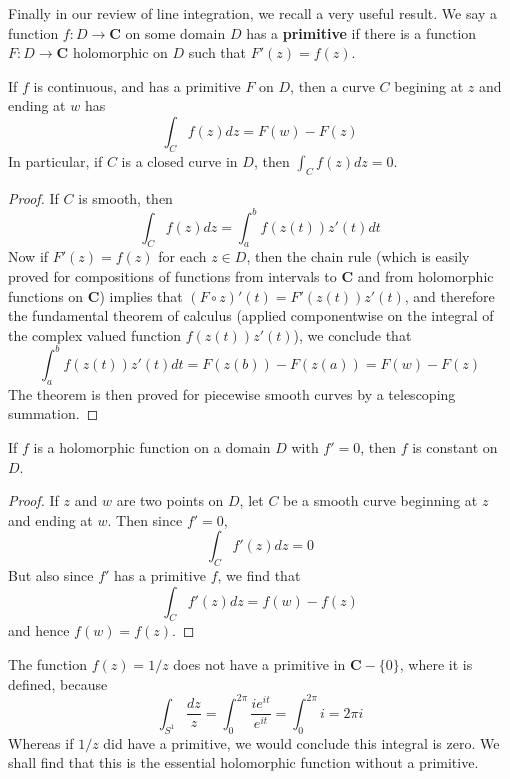 Finally in our review of line integration, we recall a very useful result. We say a function $f: D \to \mathbf{C}$ on some domain $D$ has a {\bf primitive} if there is a function $F: D \to \mathbf{C}$ holomorphic on $D$ such that $F'(z) = f(z)$.

\begin{theorem}
    If $f$ is continuous, and has a primitive $F$ on $D$, then a curve $C$ begining at $z$ and ending at $w$ has
    \[ \int_C f(z)dz = F(w) - F(z) \]
    In particular, if $C$ is a closed curve in $D$, then $\int_C f(z)dz = 0$.
\end{theorem}
\begin{proof}
    If $C$ is smooth, then
    \[ \int_C f(z)dz = \int_a^b f(z(t)) z'(t) dt \]
    Now if $F'(z) = f(z)$ for each $z \in D$, then the chain rule (which is easily proved for compositions of functions from intervals to $\mathbf{C}$ and from holomorphic functions on $\mathbf{C}$) implies that $(F \circ z)'(t) = F'(z(t)) z'(t)$, and therefore the fundamental theorem of calculus (applied componentwise on the integral of the complex valued function $f(z(t)) z'(t)$), we conclude that
    \[ \int_a^b f(z(t)) z'(t) dt = F(z(b)) - F(z(a)) = F(w) - F(z) \]
    The theorem is then proved for piecewise smooth curves by a telescoping summation.
\end{proof}

\begin{corollary}
    If $f$ is a holomorphic function on a domain $D$ with $f' = 0$, then $f$ is constant on $D$.
\end{corollary}
\begin{proof}
    If $z$ and $w$ are two points on $D$, let $C$ be a smooth curve beginning at $z$ and ending at $w$. Then since $f' = 0$,
    \[ \int_C f'(z) dz = 0  \]
    But also since $f'$ has a primitive $f$, we find that
    \[ \int_C f'(z) dz = f(w) - f(z) \]
    and hence $f(w) = f(z)$.
\end{proof}

\begin{example}
    The function $f(z) = 1/z$ does not have a primitive in $\mathbf{C} - \{ 0 \}$, where it is defined, because
    \[ \int_{S^1} \frac{dz}{z} = \int_0^{2\pi} \frac{ie^{it}}{e^{it}} = \int_0^{2\pi} i = 2 \pi i \]
    Whereas if $1/z$ did have a primitive, we would conclude this integral is zero. We shall find that this is the essential holomorphic function without a primitive.
\end{example}















